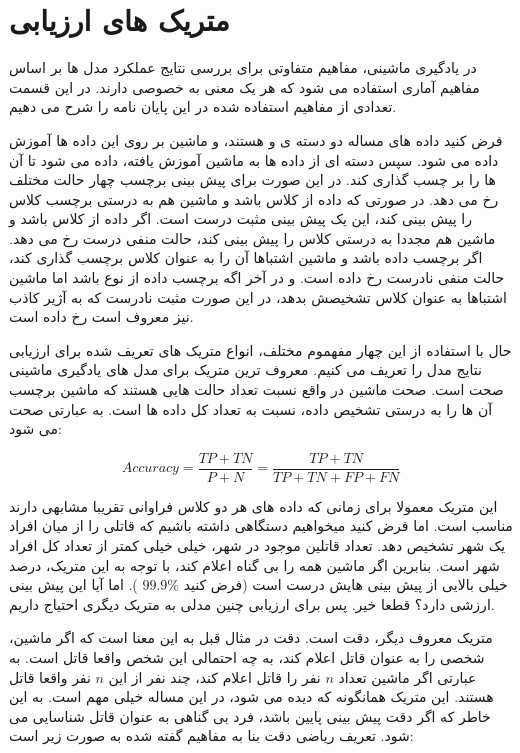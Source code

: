 \section{متریک های ارزیابی}

در یادگیری ماشینی، مفاهیم متفاوتی برای بررسی نتایج عملکرد مدل ها بر اساس مفاهیم آماری استفاده می شود که هر یک معنی به خصوصی دارند. در این قسمت تعدادی از مفاهیم استفاده شده در این پایان نامه را شرح می دهیم.

فرض کنید داده های مساله دو دسته ی
و
هستند، و ماشین بر روی این داده ها آموزش داده می شود.
سپس دسته ای از داده ها به ماشین آموزش یافته، داده می شود تا آن ها را بر چسب گذاری کند.
در این صورت برای پیش بینی برچسب
چهار حالت مختلف رخ می دهد.
در صورتی که داده از کلاس
باشد و ماشین هم به درستی برچسب کلاس
را پیش بینی کند، این یک پیش بینی مثبت درست
است.
اگر داده از کلاس
باشد و ماشین هم مجددا به درستی کلاس
را پیش بینی کند، حالت منفی درست
رخ می دهد.
اگر برچسب داده
باشد و ماشین اشتباها آن را به عنوان کلاس
برچسب گذاری کند، حالت منفی نادرست
رخ داده است.
و در آخر اگه برچسب داده از نوع
باشد اما ماشین اشتباها به عنوان کلاس
تشخیصش بدهد، در این صورت مثبت نادرست
که به آژیر کاذب نیز معروف است رخ داده است.

حال با استفاده از این چهار مفهموم مختلف، انواع متریک های تعریف شده برای ارزیابی نتایج مدل را تعریف می کنیم. معروف ترین متریک برای مدل های یادگیری ماشینی صحت
است. صحت ماشین در واقع نسبت تعداد حالت هایی هستند که ماشین برچسب آن ها را به درستی تشخیص داده، نسبت به تعداد کل داده ها است. به عبارتی صحت می شود:

\begin{equation}\label{eqn:acc}
Accuracy = \frac{TP+TN}{P+N} = \frac{TP+TN}{TP+TN+FP+FN}
\end{equation}

این متریک معمولا برای زمانی که داده های هر دو کلاس فراوانی تقریبا مشابهی دارند مناسب است. اما فرض کنید میخواهیم دستگاهی داشته باشیم که قاتلی را از میان افراد یک شهر تشخیص دهد. تعداد قاتلین موجود در شهر، خیلی خیلی کمتر از تعداد کل افراد شهر است. بنابرین اگر ماشین همه را بی گناه اعلام کند، با توجه به این متریک، درصد خیلی بالایی از پیش بینی هایش درست است‌ (فرض کنید
$99.9\%$
).
اما آیا این پیش بینی ارزشی دارد؟ قطعا خیر. پس برای ارزیابی چنین مدلی به متریک دیگری احتیاج داریم.

متریک معروف دیگر، دقت
است. دقت در مثال قبل به این معنا است که اگر ماشین، شخصی را به عنوان قاتل اعلام کند، به چه احتمالی این شخص واقعا قاتل است. به عبارتی اگر ماشین تعداد
$n$
نفر را قاتل اعلام کند، چند نفر از این
$n$
نفر واقعا قاتل هستند. این متریک همانگونه که دیده می شود، در این مساله خیلی مهم است. به این خاطر که اگر دقت پیش بینی پایین باشد، فرد بی گناهی به عنوان قاتل شناسایی می شود. تعریف ریاضی دقت بنا به مفاهیم گفته شده به صورت زیر است:

